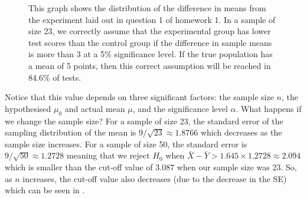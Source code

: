 \begin{figure}[h]
    \centering
    \caption{This graph shows the distribution of the difference in means from the experiment laid out in question 1 of homework 1. In a sample of size 23, we correctly assume that the experimental group has lower test scores than the control group if the difference in sample means is more than 3 at a 5\% significance level. If the true population has a mean of 5 points, then this correct assumption will be reached in 84.6\% of tests.}
    \label{fig:power1}
\end{figure}
\FloatBarrier
Notice that this value depends on three significant factors: the sample size $n$, the hypothesised $\mu_0$ and actual mean $\mu$, and the significance level $\alpha$. What happens if we change the sample size? For a sample of size 23, the standard error of the sampling distribution of the mean is $9/\sqrt{23} \approx 1.8766$ which decreases as the sample size increases. For a sample of size 50, the standard error is $9/\sqrt{50} \approx 1.2728$ meaning that we reject $H_0$ when $\bar{X} - \bar{Y} > 1.645 \times 1.2728 \approx 2.094$ which is smaller than the cut-off value of 3.087 when our sample size was 23. So, as $n$ increases, the cut-off value also decreases (due to the decrease in the SE) which can be seen in . 
